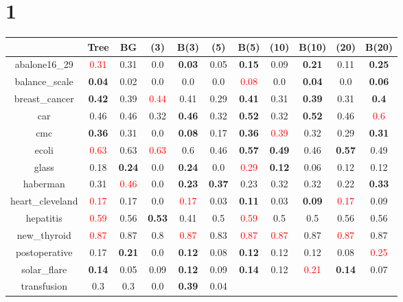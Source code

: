 \documentclass{article}%
\begin{document}
\section*{1}%
\begin{tabular}{c|cccccccccc}%
\hline%
&Tree&BG&(3)&B(3)&(5)&B(5)&(10)&B(10)&(20)&B(20)\\%
\hline%
abalone16\_29&\textcolor{red}{ 
0.31
}&0.31&0.0&\textbf{0.03}&0.05&\textbf{0.15}&0.09&\textbf{0.21}&0.11&\textbf{0.25}\\%
\hline%
balance\_scale&\textbf{0.04}&0.02&0.0&0.0&0.0&\textcolor{red}{ 
0.08
}&0.0&\textbf{0.04}&0.0&\textbf{0.06}\\%
\hline%
breast\_cancer&\textbf{0.42}&0.39&\textcolor{red}{ 
0.44
}&0.41&0.29&\textbf{0.41}&0.31&\textbf{0.39}&0.31&\textbf{0.4}\\%
\hline%
car&0.46&0.46&0.32&\textbf{0.46}&0.32&\textbf{0.52}&0.32&\textbf{0.52}&0.46&\textcolor{red}{ 
0.6
}\\%
\hline%
cmc&\textbf{0.36}&0.31&0.0&\textbf{0.08}&0.17&\textbf{0.36}&\textcolor{red}{ 
0.39
}&0.32&0.29&\textbf{0.31}\\%
\hline%
ecoli&\textcolor{red}{ 
0.63
}&0.63&\textcolor{red}{ 
0.63
}&0.6&0.46&\textbf{0.57}&\textbf{0.49}&0.46&\textbf{0.57}&0.49\\%
\hline%
glass&0.18&\textbf{0.24}&0.0&\textbf{0.24}&0.0&\textcolor{red}{ 
0.29
}&\textbf{0.12}&0.06&0.12&0.12\\%
\hline%
haberman&0.31&\textcolor{red}{ 
0.46
}&0.0&\textbf{0.23}&\textbf{0.37}&0.23&0.32&0.32&0.22&\textbf{0.33}\\%
\hline%
heart\_cleveland&\textcolor{red}{ 
0.17
}&0.17&0.0&\textcolor{red}{ 
0.17
}&0.03&\textbf{0.11}&0.03&\textbf{0.09}&\textcolor{red}{ 
0.17
}&0.09\\%
\hline%
hepatitis&\textcolor{red}{ 
0.59
}&0.56&\textbf{0.53}&0.41&0.5&\textcolor{red}{ 
0.59
}&0.5&0.5&0.56&0.56\\%
\hline%
new\_thyroid&\textcolor{red}{ 
0.87
}&0.87&0.8&\textcolor{red}{ 
0.87
}&0.83&\textcolor{red}{ 
0.87
}&\textcolor{red}{ 
0.87
}&0.87&\textcolor{red}{ 
0.87
}&0.87\\%
\hline%
postoperative&0.17&\textbf{0.21}&0.0&\textbf{0.12}&0.08&\textbf{0.12}&0.12&0.12&0.08&\textcolor{red}{ 
0.25
}\\%
\hline%
solar\_flare&\textbf{0.14}&0.05&0.09&\textbf{0.12}&0.09&\textbf{0.14}&0.12&\textcolor{red}{ 
0.21
}&\textbf{0.14}&0.07\\%
\hline%
transfusion&0.3&0.3&0.0&\textbf{0.39}&0.04&\textcolor{red}{ 
}
\end{tabular}
\end{document}
